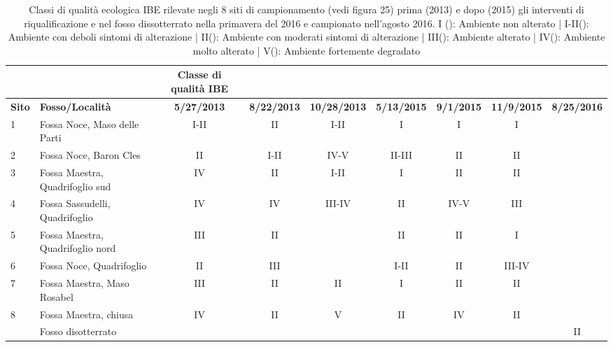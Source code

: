 \documentclass[11pt,a4paper,italian,twoside,openany]{memoir}
\begin{document}
\begin{landscape}
\begin{table}[]
\centering
\begin{tabular}{@{}llccccccc@{}}
\toprule
\textbf{}& \textbf{} & \textbf{Classe di qualità  IBE} & \textbf{}& \textbf{} & \textbf{}& \textbf{} & \textbf{}& \textbf{}\\ \midrule
\textbf{Sito} & \textbf{Fosso/Località}  & \textbf{5/27/2013} & \textbf{8/22/2013} & \textbf{10/28/2013} & \textbf{5/13/2015} & \textbf{9/1/2015} & \textbf{11/9/2015} & \textbf{8/25/2016} \\
\midrule
1& Fossa Noce, Maso delle Parti & \cellcolor{SeaGreen}I-II & \cellcolor{LimeGreen}II & \cellcolor{SeaGreen}I-II & \cellcolor{Cyan}I& \cellcolor{Cyan}I &\cellcolor{Cyan} I&\\
2& Fossa Noce, Baron Cles & \cellcolor{LimeGreen}II& \cellcolor{SeaGreen}I-II  & \cellcolor{BrickRed}IV-V & \cellcolor{GreenYellow}II-III& \cellcolor{LimeGreen}II & \cellcolor{LimeGreen}II &\\
3& Fossa Maestra, Quadrifoglio sud & \cellcolor{BurntOrange}IV& \cellcolor{LimeGreen}II & \cellcolor{SeaGreen}I-II & \cellcolor{Cyan}I& \cellcolor{LimeGreen}II & \cellcolor{LimeGreen}II &\\
4& Fossa Sassudelli, Quadrifoglio  & \cellcolor{BurntOrange}IV& \cellcolor{BurntOrange}IV& \cellcolor{Dandelion}III-IV & \cellcolor{LimeGreen}II & \cellcolor{BrickRed}IV-V & \cellcolor{Goldenrod}III&\\
5& Fossa Maestra, Quadrifoglio nord& \cellcolor{Goldenrod}III& \cellcolor{LimeGreen}II & & \cellcolor{LimeGreen}II & \cellcolor{LimeGreen}II & \cellcolor{Cyan}I&\\
6& Fossa Noce, Quadrifoglio & \cellcolor{LimeGreen}II& \cellcolor{Goldenrod}III& & \cellcolor{SeaGreen}I-II  & \cellcolor{LimeGreen}II & \cellcolor{Dandelion}III-IV&\\
7& Fossa Maestra, Maso Rosabel& \cellcolor{Goldenrod}III& \cellcolor{LimeGreen}II & \cellcolor{LimeGreen}II& \cellcolor{Cyan}I& \cellcolor{LimeGreen}II & \cellcolor{LimeGreen}II &\\
8& Fossa Maestra, chiusa & \cellcolor{BurntOrange}IV& \cellcolor{LimeGreen}II & \cellcolor{Red}V& \cellcolor{LimeGreen}II & \cellcolor{BurntOrange}IV& \cellcolor{LimeGreen}II &\\
 & Fosso disotterrato  &&& && && \cellcolor{LimeGreen}II \\
\bottomrule
\end{tabular}%
\caption{Classi di qualità ecologica IBE rilevate negli 8 siti di campionamento (vedi figura 25) prima (2013) e dopo (2015) gli interventi di riqualificazione e nel fosso dissotterrato nella primavera del 2016 e campionato nell'agosto 2016. I (\crule[Cyan]{.2cm}{.2cm}): Ambiente non alterato | I-II(\crule[SeaGreen]{.2cm}{.2cm}): Ambiente con deboli sintomi di alterazione | II(\crule[LimeGreen]{.2cm}{.2cm}):  Ambiente con moderati sintomi di alterazione | III(\crule[Goldenrod]{.2cm}{.2cm}): Ambiente alterato | IV(\crule[BurntOrange]{.2cm}{.2cm}): Ambiente molto alterato | V(\crule[Red]{.2cm}{.2cm}): Ambiente fortemente degradato}
\label{tab_7}
\end{table}
\end{landscape}
\end{document}

